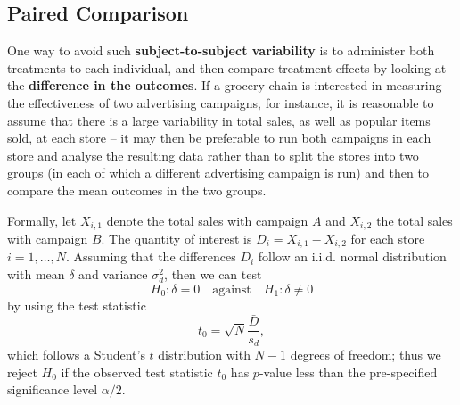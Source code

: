 \subsection{Paired Comparison}
One way to avoid such \textbf{subject-to-subject variability} is to administer both treatments to each individual,  and then compare treatment effects by looking at the \textbf{difference in the outcomes}. If a grocery chain is interested in measuring the effectiveness of two advertising campaigns, for instance, it is reasonable to assume that there is a large variability in total sales, as well as popular items sold, at each store -- it may then be preferable to run both campaigns in each store and analyse the resulting data rather than to split the stores into two groups (in each of which a different advertising campaign is run) and then to compare the mean outcomes in the two groups. 

Formally, let $X_{i,1}$ denote the total sales with campaign $A$ and $X_{i,2}$ the total sales with campaign $B$. The quantity of interest is $D_{i}=X_{i,1}-X_{i,2}$ for each store $i=1,\ldots,N$. Assuming that the differences $D_{i}$ follow an {i.i.d.} normal distribution with mean $\delta$ and variance $\sigma^{2}_{d}$, then we can test $$H_{0}: \delta=0\quad\mbox{against}\quad H_{1}: \delta \neq 0$$ by using the test statistic $$t_0=\sqrt{N}\frac{\bar{D}}{s_{d}},$$ which follows a Student's $t$ distribution with  $N-1$ degrees of freedom; thus we reject $H_{0}$ if the observed test statistic $t_{0}$ has $p$-value less than the pre-specified significance level $\alpha/2$.

